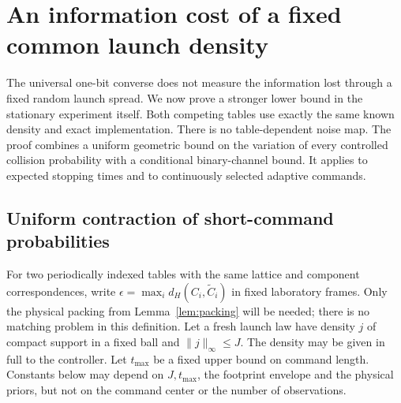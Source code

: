 \section{An information cost of a fixed common launch density}
\label{sec:stationary-information}
The universal one-bit converse does not measure the information lost
through a fixed random launch spread. We now prove a stronger lower
bound in the stationary experiment itself. Both competing tables use
exactly the same known density and exact implementation. There is no
table-dependent noise map. The proof combines a uniform geometric
bound on the variation of every controlled collision probability with
a conditional binary-channel bound. It applies to expected stopping
times and to continuously selected adaptive commands.

\subsection{Uniform contraction of short-command probabilities}
For two periodically indexed tables with the same lattice and component
correspondences, write
$\epsilon=\max_i d_H(C_i,\widetilde C_i)$ in fixed laboratory frames.
Only the physical packing from Lemma~\ref{lem:packing} will be needed;
there is no matching problem in this definition. Let a fresh launch
law have density $j$ of compact support in a fixed ball and
$\|j\|_\infty\le J$. The density may be given in full to the controller.
Let $t_{\max}$ be a fixed upper bound on command length. Constants below
may depend on $J,t_{\max}$, the footprint envelope and the physical
priors, but not on the command center or the number of observations.

